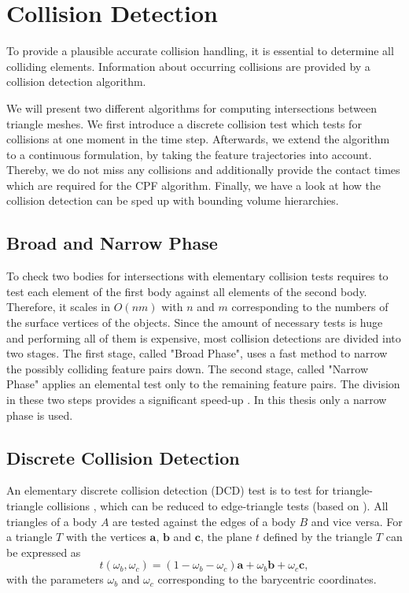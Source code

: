 \chapter{Collision Detection}
\label{ch:CollisionDetection}
To provide a plausible accurate collision handling, it is essential to determine all colliding elements. Information about occurring collisions are provided by a collision detection algorithm.

We will present two different algorithms for computing intersections between triangle meshes. We first introduce a discrete collision test which tests for collisions at one moment in the time step. Afterwards, we extend the algorithm to a continuous formulation, by taking the feature trajectories into account. Thereby, we do not miss any collisions and additionally provide the contact times which are required for the CPF algorithm. Finally, we have a look at how the collision detection can be sped up with bounding volume hierarchies.

\section{Broad and Narrow Phase}
To check two bodies for intersections with elementary collision tests requires to test each element of the first body against all elements of the second body. Therefore, it scales in $O(nm)$ with $n$ and $m$ corresponding to the numbers of the surface vertices of the objects.
Since the amount of necessary tests is huge and performing all of them is expensive, most collision detections are divided into two stages.
The first stage, called "Broad Phase", uses a fast method to narrow the possibly colliding feature pairs down.
The second stage, called "Narrow Phase" applies an elemental test only to the remaining feature pairs.
The division in these two steps provides a significant speed-up \cite{BENDER2007}. In this thesis only a narrow phase is used.
\section{Discrete Collision Detection}
\label{sec:DCD}
An elementary discrete collision detection (DCD) test is to test for triangle-triangle collisions \cite{MOLLER1997}, which can be reduced to edge-triangle tests (based on \cite{Akenine-Moller2002}). All triangles of a body $A$ are tested against the edges of a body $B$ and vice versa. For a triangle $T$ with the vertices $\mathbf a$, $\mathbf b$ and $\mathbf c$, the plane $t$ defined by the triangle $T$ can be expressed as
\begin{equation}
t(\omega_b,\omega_c)=(1-\omega_b-\omega_c)\mathbf a +\omega_b \mathbf b + \omega_c \mathbf c,
\end{equation}
with the parameters $\omega_b$ and $\omega_c$ corresponding to the barycentric coordinates.

